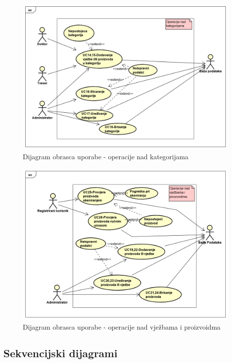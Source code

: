 					\begin{figure}[H]
						\includegraphics[scale=0.50]{dijagrami/UseCase/UseCase Diagram4.PNG}
						\centering
						\caption{Dijagram obrasca uporabe - operacije nad kategorijama}
						\label{fig:promjene}
					\end{figure}
				
					\begin{figure}[H]
						\includegraphics[scale=0.50]{dijagrami/UseCase/UseCase Diagram5.PNG}
						\centering
						\caption{Dijagram obrasca uporabe - operacije nad vježbama i proizvoidma}
						\label{fig:promjene}
					\end{figure}
				
			\subsection{Sekvencijski dijagrami}
				
